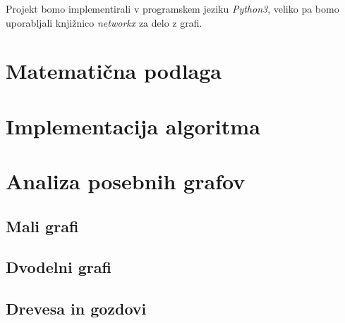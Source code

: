 \documentclass[12pt,a4paper]{amsart}
\theoremstyle{definition} %
\theoremstyle{plain} %
\begin{document}
Projekt bomo implementirali v programskem jeziku \emph{Python3}, veliko pa bomo uporabljali knjižnico \emph{networkx} za delo z grafi.

\section{Matematična podlaga}

\section{Implementacija algoritma}

\section{Analiza posebnih grafov}

\subsection{Mali grafi}
\subsection{Dvodelni grafi}
\subsection{Drevesa in gozdovi}
\end{document}
